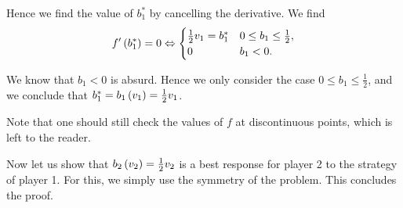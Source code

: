 Hence we find the value of $b_1^{*}$ by cancelling the derivative. We find
\begin{equation*}
    f' \left(b_1^{*}\right) = 0
    \Leftrightarrow
    \begin{cases}
       \frac{1}{2} v_1 = b_1^{*}  & 0 \leq b_1 \leq \frac{1}{2}, \\
       0 & b_1 < 0.
     \end{cases}
\end{equation*}

We know that $b_1 < 0$ is absurd. Hence we only consider the case $0 \leq b_1 \leq \frac{1}{2}$, and we conclude that $b_1^{*} = b_1 \left(v_1\right) = \frac{1}{2} v_1$.

Note that one should still check the values of $f$ at discontinuous points, which is left to the reader.


\vspace{5mm}

Now let us show that $b_2 \left(v_2\right) = \frac{1}{2} v_2$ is a best response for player 2 to the strategy of player 1. For this, we simply use the symmetry of the problem. This concludes the proof.
